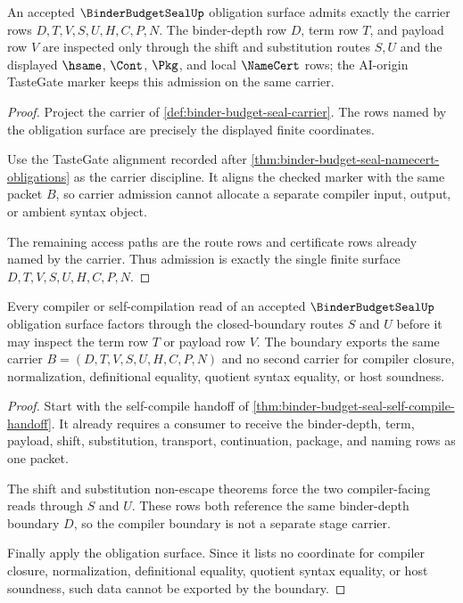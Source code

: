 \begin{theorem}
\label{thm:binder-budget-seal-carrier-admission}
An accepted $\BinderBudgetSealUp$ obligation surface admits exactly the carrier rows $D,T,V,S,U,H,C,P,N$. The binder-depth row $D$, term row $T$, and payload row $V$ are inspected only through the shift and substitution routes $S,U$ and the displayed $\hsame$, $\Cont$, $\Pkg$, and local $\NameCert$ rows; the AI-origin TasteGate marker keeps this admission on the same carrier.
\end{theorem}
\begin{proof}
Project the carrier of \autoref{def:binder-budget-seal-carrier}. The rows named by the obligation surface are precisely the displayed finite coordinates.

Use the TasteGate alignment recorded after \autoref{thm:binder-budget-seal-namecert-obligations} as the carrier discipline. It aligns the checked marker with the same packet $B$, so carrier admission cannot allocate a separate compiler input, output, or ambient syntax object.

The remaining access paths are the route rows and certificate rows already named by the carrier. Thus admission is exactly the single finite surface $D,T,V,S,U,H,C,P,N$.
\end{proof}

\begin{theorem}
\label{thm:binder-budget-seal-compiler-boundary}
Every compiler or self-compilation read of an accepted $\BinderBudgetSealUp$ obligation surface factors through the closed-boundary routes $S$ and $U$ before it may inspect the term row $T$ or payload row $V$. The boundary exports the same carrier $B=(D,T,V,S,U,H,C,P,N)$ and no second carrier for compiler closure, normalization, definitional equality, quotient syntax equality, or host soundness.
\end{theorem}
\begin{proof}
Start with the self-compile handoff of \autoref{thm:binder-budget-seal-self-compile-handoff}. It already requires a consumer to receive the binder-depth, term, payload, shift, substitution, transport, continuation, package, and naming rows as one packet.

The shift and substitution non-escape theorems force the two compiler-facing reads through $S$ and $U$. These rows both reference the same binder-depth boundary $D$, so the compiler boundary is not a separate stage carrier.

Finally apply the obligation surface. Since it lists no coordinate for compiler closure, normalization, definitional equality, quotient syntax equality, or host soundness, such data cannot be exported by the boundary.
\end{proof}

